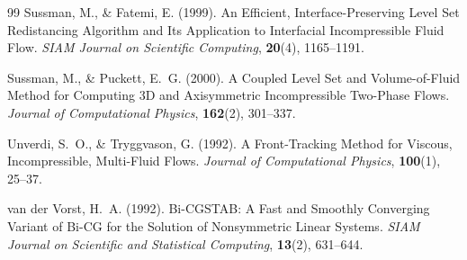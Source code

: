 \documentclass[12pt, a4paper, titlepage, xelatex, ja=standard]{bxjsarticle}
\begin{document}
\begin{thebibliography}{99}
Sussman, M., \& Fatemi, E. (1999).
An Efficient, Interface-Preserving Level Set Redistancing Algorithm and Its Application to Interfacial Incompressible Fluid Flow.
\textit{SIAM Journal on Scientific Computing}, \textbf{20}(4), 1165--1191.

Sussman, M., \& Puckett, E.~G. (2000).
A Coupled Level Set and Volume-of-Fluid Method for Computing 3D and Axisymmetric Incompressible Two-Phase Flows.
\textit{Journal of Computational Physics}, \textbf{162}(2), 301--337.

Unverdi, S.~O., \& Tryggvason, G. (1992).
A Front-Tracking Method for Viscous, Incompressible, Multi-Fluid Flows.
\textit{Journal of Computational Physics}, \textbf{100}(1), 25--37.

van der Vorst, H.~A. (1992).
Bi-CGSTAB: A Fast and Smoothly Converging Variant of Bi-CG for the Solution of Nonsymmetric Linear Systems.
\textit{SIAM Journal on Scientific and Statistical Computing}, \textbf{13}(2), 631--644.

\end{thebibliography}
\end{document}
